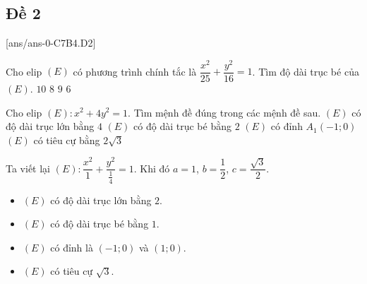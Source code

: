 \subsection{Đề 2}
[ans/ans-0-C7B4.D2]
\caulc
\begin{ex}%
	Cho elip $(E)$ có phương trình chính tắc là $\dfrac{x^2}{25}+\dfrac{y^2}{16}=1$. Tìm độ dài trục bé  của $(E)$.
	\choice
	{ $10$}
	{\True $8$}
	{$9$}
	{$6$}
\end{ex}
\begin{ex}%
	Cho elip $(E)\colon  x^2+4 y^2=1$. Tìm mệnh đề
	đúng trong các mệnh đề sau.
	\choice
	{$(E)$ có độ dài trục lớn bằng $ 4 $}
	{$ (E) $ có độ dài trục bé bằng $ 2 $}
	{\True $(E)$ có đỉnh $A_1(-1 ; 0)$}
	{$(E)$ có tiêu cự bằng $2\sqrt{3}$}
	\loigiai
	{
		Ta viết lại $ (E)\colon \dfrac{x^2}{1}+\dfrac{y^2}{\frac{1}{4}} =1$.
		Khi đó $ a=1 $, $ b=\dfrac{1}{2} $, $ c=\dfrac{\sqrt{3}}{2} $.
		\begin{itemize}
			\item $ (E) $ có độ dài trục lớn bằng $ 2 $.
			\item $ (E) $ có độ dài  trục bé bằng $ 1 $.
			\item $ (E) $ có đỉnh là $ (-1;0) $ và $ (1;0) $.
			\item$ (E) $ có tiêu cự $ \sqrt{3} $.
		\end{itemize}
	}
\end{ex}

